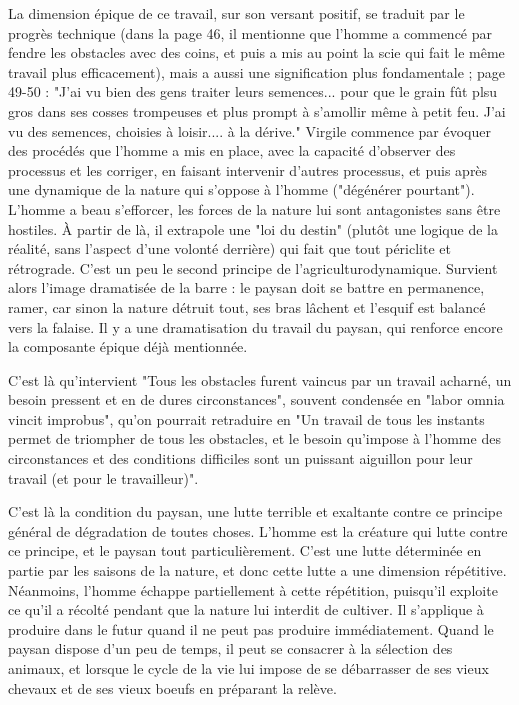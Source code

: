 \documentclass[a4paper,12pt]{book}
\begin{document}
\par La dimension épique de ce travail, sur son versant positif, se traduit par le progrès technique (dans la page 46, il mentionne que l'homme a commencé par fendre les obstacles avec des coins, et puis a mis au point la scie qui fait le même travail plus efficacement), mais a aussi une signification plus fondamentale ; page 49-50 : "J'ai vu bien des gens traiter leurs semences... pour que le grain fût plsu gros dans ses cosses trompeuses et plus prompt à s'amollir même à petit feu. J'ai vu des semences, choisies à loisir.... à la dérive." Virgile commence par évoquer des procédés que l'homme a mis en place, avec la capacité d'observer des processus et les corriger, en faisant intervenir d'autres processus, et puis après une dynamique de la nature qui s'oppose à l'homme ("dégénérer pourtant"). L'homme a beau s'efforcer, les forces de la nature lui sont antagonistes sans être hostiles. À partir de là, il extrapole une "loi du destin" (plutôt une logique de la réalité, sans l'aspect d'une volonté derrière) qui fait que tout périclite et rétrograde. C'est un peu le second principe de l'agriculturodynamique. Survient alors l'image dramatisée de la barre : le paysan doit se battre en permanence, ramer, car sinon la nature détruit tout, ses bras lâchent et l'esquif est balancé vers la falaise. Il y a une dramatisation du travail du paysan, qui renforce encore la composante épique déjà mentionnée.
\par C'est là qu'intervient "Tous les obstacles furent vaincus par un travail acharné, un besoin pressent et en de dures circonstances", souvent condensée en "labor omnia vincit improbus", qu'on pourrait retraduire en "Un travail de tous les instants permet de triompher de tous les obstacles, et le besoin qu'impose à l'homme des circonstances et des conditions difficiles sont un puissant aiguillon pour leur travail (et pour le travailleur)".
\par C'est là la condition du paysan, une lutte terrible et exaltante contre ce principe général de dégradation de toutes choses. L'homme est la créature qui lutte contre ce principe, et le paysan tout particulièrement. C'est une lutte déterminée en partie par les saisons de la nature, et donc cette lutte a une dimension répétitive. Néanmoins, l'homme échappe partiellement à cette répétition, puisqu'il exploite ce qu'il a récolté pendant que la nature lui interdit de cultiver. Il s'applique à produire dans le futur quand il ne peut pas produire immédiatement. Quand le paysan dispose d'un peu de temps, il peut se consacrer à la sélection des animaux, et lorsque le cycle de la vie lui impose de se débarrasser de ses vieux chevaux et de ses vieux boeufs en préparant la relève.
\end{document}
